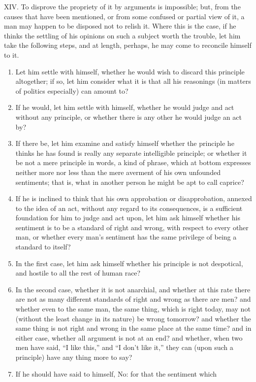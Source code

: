 \documentclass[12pt]{report}
\begin{document}
XIV. To disprove the propriety of it by arguments is impossible; but,
from the causes that have been mentioned, or from some confused or
partial view of it, a man may happen to be disposed not to relish it.
Where this is the case, if he thinks the settling of his opinions on
such a subject worth the trouble, let him take the following steps, and
at length, perhaps, he may come to reconcile himself to it.
\begin{enumerate}
	\item Let him settle with himself, whether he would wish to discard this
principle altogether; if so, let him consider what it is that all his
reasonings (in matters of politics especially) can amount to?
	\item If he would, let him settle with himself, whether he would judge and
act without any principle, or whether there is any other he would judge
an act by?
	\item If there be, let him examine and satisfy himself whether the
principle he thinks he has found is really any separate intelligible
principle; or whether it be not a mere principle in words, a kind of
phrase, which at bottom expresses neither more nor less than the mere
averment of his own unfounded sentiments; that is, what in another
person he might be apt to call caprice?
	\item If he is inclined to think that his own approbation or
disapprobation, annexed to the idea of an act, without any regard to its
consequences, is a sufficient foundation for him to judge and act upon,
let him ask himself whether his sentiment is to be a standard of right
and wrong, with respect to every other man, or whether every man's
sentiment has the same privilege of being a standard to itself?
	\item In the first case, let him ask himself whether his principle is not
despotical, and hostile to all the rest of human race?
	\item In the second case, whether it is not anarchial, and whether at this
rate there are not as many different standards of right and wrong as
there are men? and whether even to the same man, the same thing, which
is right today, may not (without the least change in its nature) be
wrong tomorrow? and whether the same thing is not right and wrong in the
same place at the same time? and in either case, whether all argument is
not at an end? and whether, when two men have said, ``I like this,'' and
``I don't like it,'' they can (upon such a principle) have any thing
more to say?
	\item If he should have said to himself, No: for that the sentiment which

\end{enumerate}
\end{document}
